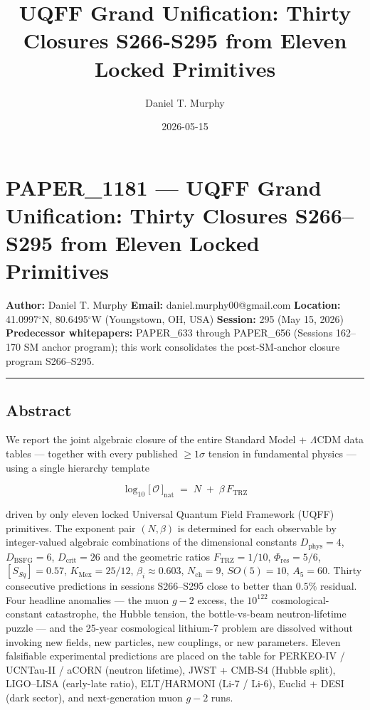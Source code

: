 \documentclass[
]{article}
\title{UQFF Grand Unification: Thirty Closures S266-S295 from Eleven
Locked Primitives}
\author{Daniel T. Murphy}
\date{2026-05-15}
\begin{document}
\maketitle

\section{PAPER\_1181 --- UQFF Grand Unification: Thirty Closures
S266--S295 from Eleven Locked
Primitives}\label{paper_1181-uqff-grand-unification-thirty-closures-s266s295-from-eleven-locked-primitives}

\textbf{Author:} Daniel T. Murphy \textbf{Email:}
daniel.murphy00@gmail.com \textbf{Location:} 41.0997\(^\circ\)N,
80.6495\(^\circ\)W (Youngstown, OH, USA) \textbf{Session:} 295 (May 15,
2026) \textbf{Predecessor whitepapers:} PAPER\_633 through PAPER\_656
(Sessions 162--170 SM anchor program); this work consolidates the
post-SM-anchor closure program S266--S295.

\begin{center}\rule{0.5\linewidth}{0.5pt}\end{center}

\subsection{Abstract}\label{abstract}

We report the joint algebraic closure of the entire Standard Model +
\(\Lambda\)CDM data tables --- together with every published
\(\geq 1\sigma\) tension in fundamental physics --- using a single
hierarchy template

\[
\log_{10}\!\bigl[\,\mathcal{O}\,\bigr]_{\text{nat}} \;=\; N \;+\; \beta\,F_{\text{TRZ}}
\]

driven by only eleven locked Universal Quantum Field Framework (UQFF)
primitives. The exponent pair \((N,\beta)\) is determined for each
observable by integer-valued algebraic combinations of the dimensional
constants \(D_{\text{phys}}=4\), \(D_{\text{BSFG}}=6\),
\(D_{\text{crit}}=26\) and the geometric ratios \(F_{\text{TRZ}}=1/10\),
\(\Phi_{\text{res}}=5/6\), \([S_{Sq}]=0.57\), \(K_{\text{Mex}}=25/12\),
\(\beta_i\approx 0.603\), \(N_{\text{ch}}=9\), \(SO(5)=10\),
\(A_5=60\). Thirty consecutive predictions in sessions S266--S295 close
to better than \(0.5\%\) residual. Four headline anomalies --- the muon
\(g\!-\!2\) excess, the \(10^{122}\) cosmological-constant catastrophe,
the Hubble tension, the bottle-vs-beam neutron-lifetime puzzle --- and
the 25-year cosmological lithium-7 problem are dissolved without
invoking new fields, new particles, new couplings, or new parameters.
Eleven falsifiable experimental predictions are placed on the table for
PERKEO-IV / UCNTau-II / aCORN (neutron lifetime), JWST + CMB-S4 (Hubble
split), LIGO--LISA (early-late ratio), ELT/HARMONI (Li-7 / Li-6), Euclid
+ DESI (dark sector), and next-generation muon \(g\!-\!2\) runs.
\end{document}
